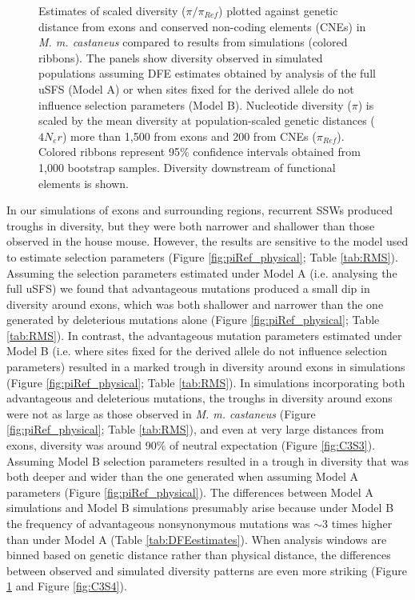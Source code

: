 \begin{figure}[H]
   \centering      
   \noindent{}
 \caption[Reductions in diversity caused by background selection and selective sweeps in simulated data - genetic distance]{Estimates of scaled diversity ($\pi / \pi_{Ref}$) plotted against genetic distance from exons and conserved non-coding elements (CNEs) in \textit{M. m. castaneus} compared to results from simulations (colored ribbons). The panels show diversity observed in simulated populations assuming DFE estimates obtained by analysis of the full uSFS (Model A) or when sites fixed for the derived allele do not influence selection parameters (Model B). Nucleotide diversity ($\pi$) is scaled by the mean diversity at population-scaled genetic distances ($4N_er$) more than 1,500 from exons and 200 from CNEs ($\pi_{Ref}$). Colored ribbons represent 95\% confidence intervals obtained from 1,000 bootstrap samples. Diversity downstream of functional elements is shown.}
 \label{fig:piRef_genetic}
\end{figure}

	In our simulations of exons and surrounding regions, recurrent SSWs produced troughs in diversity, but they were both narrower and shallower than those observed in the house mouse. However, the results are sensitive to the model used to estimate selection parameters (Figure \ref{fig:piRef_physical}; Table \ref{tab:RMS}). Assuming the selection parameters estimated under Model A (i.e. analysing the full uSFS) we found that advantageous mutations produced a small dip in diversity around exons, which was both shallower and narrower than the one generated by deleterious mutations alone (Figure \ref{fig:piRef_physical}; Table \ref{tab:RMS}). In contrast, the advantageous mutation parameters estimated under Model B (i.e. where sites fixed for the derived allele do not influence selection parameters) resulted in a marked trough in diversity around exons in simulations (Figure \ref{fig:piRef_physical}; Table \ref{tab:RMS}). In simulations incorporating both advantageous and deleterious mutations, the troughs in diversity around exons were not as large as those observed in \textit{M. m. castaneus} (Figure \ref{fig:piRef_physical}; Table \ref{tab:RMS}), and even at very large distances from exons, diversity was around 90\% of neutral expectation (Figure \ref{fig:C3S3}). Assuming Model B selection parameters resulted in a trough in diversity that was both deeper and wider than the one generated when assuming Model A parameters (Figure \ref{fig:piRef_physical}). The differences between Model A simulations and Model B simulations presumably arise because under Model B the frequency of advantageous nonsynonymous mutations was $\sim$3 times higher than under Model A (Table \ref{tab:DFEestimates}). When analysis windows are binned based on genetic distance rather than physical distance, the differences between observed and simulated diversity patterns are even more striking (Figure \ref{fig:piRef_genetic} and Figure \ref{fig:C3S4}). 


